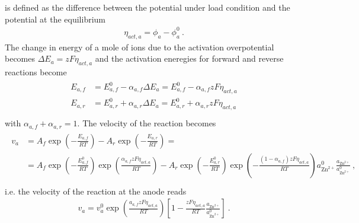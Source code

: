 \documentclass[letterpaper,10pt,english]{jupyterBook}
\begin{document}
\sphinxAtStartPar
{} is defined as the difference between the potential under load condition and the potential at the equilibrium
\begin{equation*}
\begin{split}\eta_{act, a} = \phi_a - \phi_a^0 \ .\end{split}
\end{equation*}
\sphinxAtStartPar
The change in energy of a mole of ions due to the activation overpotential becomes \(\Delta E_a = z F \eta_{act, a}\) and the activation eneregies for forward and reverse reactions become
\begin{equation*}
\begin{split}\begin{aligned}
  E_{a,f} & = E_{a,f}^0 - \alpha_{a,f} \Delta E_{a} = E_{a,f}^0 - \alpha_{a,f} z F \eta_{act,a}  \\
  E_{a,r} & = E_{a,r}^0 + \alpha_{a,r} \Delta E_{a} = E_{a,r}^0 + \alpha_{a,r} z F \eta_{act,a}  \\
\end{aligned}\end{split}
\end{equation*}
\sphinxAtStartPar
with \(\alpha_{a,f} + \alpha_{a,r} = 1\). The velocity of the reaction becomes
\begin{equation*}
\begin{split}\begin{aligned}
  v_a
  & = A_f \exp\left( - \frac{E_{a,f}}{RT} \right) - A_r \exp\left( - \frac{E_{a,r}}{RT} \right) = \\
  & = A_f \exp\left( - \frac{E^0_{a,f}}{RT} \right) \exp\left( \frac{\alpha_{a,f} z F \eta_{act,a}}{RT} \right) - A_r \exp\left( - \frac{E^0_{a,r}}{RT} \right) \exp\left( - \frac{ ( 1 - \alpha_{a,f} ) z F \eta_{act,a}}{RT} \right) a_{\text{Zn}^{2+}}^0 \frac{a_{\text{Zn}^{2+}}}{a_{\text{Zn}^{2+}}^0} \ , \\
\end{aligned}\end{split}
\end{equation*}
\sphinxAtStartPar
i.e. the velocity of the reaction at the anode reads
\begin{equation*}
\begin{split}
  v_a = v_a^0 \exp\left( \frac{a_{a,f} z F \eta_{act,a}}{RT} \right) \left[ 1 - \frac{z F \eta_{act,a}}{RT} \frac{a_{\text{Zn}^{2+}}}{a_{\text{Zn}^{2+}}^0} \right] \ .
\end{split}
\end{equation*}
\end{document}

